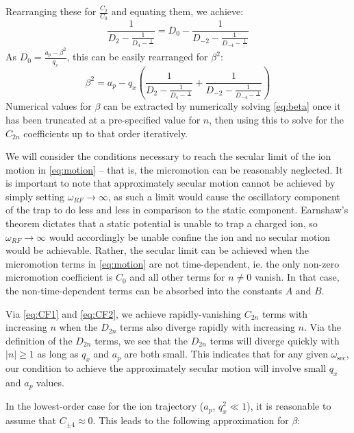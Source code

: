 \documentclass{article}
\begin{document}
Rearranging these for $\frac{C_2}{C_0}$ and equating them, we achieve:
\begin{equation}
\frac{1}{D_2 - \frac{1}{D_4 - \frac{1}{\dots}}}	= D_0 - \frac{1}{D_{-2} - \frac{1}{D_{-4} - \frac{1}{\dots}}}
\end{equation}
As $D_0 = \frac{a_p - \beta^2}{q_x}$, this can be easily rearranged for $\beta^2$:
\begin{equation}
\beta^2 = a_p - q_x \left( \frac{1}{D_2 - \frac{1}{D_4 - \frac{1}{\dots}}} + \frac{1}{D_{-2} - \frac{1}{D_{-4} - \frac{1}{\dots}}} \right) \label{eq:beta}
\end{equation}
Numerical values for $\beta$ can be extracted by numerically solving \eqref{eq:beta} once it has been truncated at a pre-specified value for $n$, then using this to solve for the $C_{2n}$ coefficients up to that order iteratively. \par
\medskip
\noindent We will consider the conditions necessary to reach the secular limit of the ion motion in \eqref{eq:motion} -- that is, the micromotion can be reasonably neglected. It is important to note that approximately secular motion cannot be achieved by simply setting $\omega_{RF} \rightarrow \infty$, as such a limit would cause the oscillatory component of the trap to do less and less in comparison to the static component. Earnshaw's theorem dictates that a static potential is unable to trap a charged ion, so $\omega_{RF} \rightarrow \infty$ would accordingly be unable confine the ion and no secular motion would be achievable. Rather, the secular limit can be achieved when the micromotion terms in \eqref{eq:motion} are not time-dependent, ie. the only non-zero micromotion coefficient is $C_0$ and all other terms for $n \neq 0$ vanish. In that case, the non-time-dependent terms can be absorbed into the constants $A$ and $B$. \par
\medskip
\noindent Via \eqref{eq:CF1} and \eqref{eq:CF2}, we achieve rapidly-vanishing $C_{2n}$ terms with increasing $n$ when the $D_{2n}$ terms also diverge rapidly with increasing $n$. Via the definition of the $D_{2n}$ terms, we see that the $D_{2n}$ terms will diverge quickly with $|n| \ge 1$ as long as $q_x$ and $a_p$ are both small. This indicates that for any given $\omega_{\text{sec}}$, our condition to achieve the approximately secular motion will involve small $q_x$ and $a_p$ values. \par
\medskip
\noindent In the lowest-order case for the ion trajectory ($a_p$, $q_x^2 \ll 1$), it is reasonable to assume that $C_{\pm 4} \approx 0$. This leads to the following approximation for $\beta$:
\end{document}
